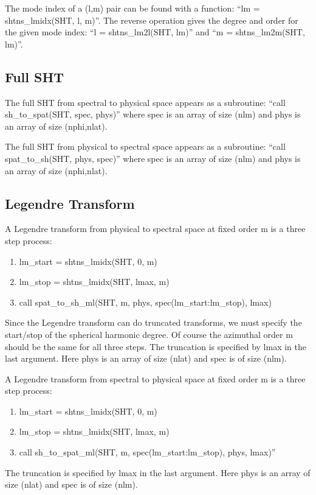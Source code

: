 \documentclass[10pt,letterpaper]{article}
\begin{document}
The mode index of a (l,m) pair can be found with a function:
``lm = shtns\_lmidx(SHT, l, m)''. The reverse operation gives the degree and order for
the given mode index: ``l = shtns\_lm2l(SHT, lm)'' and ``m = shtns\_lm2m(SHT, lm)''.

\subsection{Full SHT}
The full SHT from spectral to physical space appears as a subroutine:
``call sh\_to\_spat(SHT, spec, phys)'' where spec is an array of size (nlm) and
phys is an array of size (nphi,nlat).

The full SHT from physical to spectral space appears as a subroutine:
``call spat\_to\_sh(SHT, phys, spec)'' where spec is an array of size (nlm) and
phys is an array of size (nphi,nlat).

\subsection{Legendre Transform}
A Legendre transform from physical to spectral space at fixed order m is a three
step process:
\begin{enumerate}
  \item lm\_start = shtns\_lmidx(SHT, 0, m)
  \item lm\_stop = shtns\_lmidx(SHT, lmax, m)
  \item call spat\_to\_sh\_ml(SHT, m, phys, spec(lm\_start:lm\_stop), lmax)
\end{enumerate}
Since the Legendre transform can do truncated transforms, we must specify the start/stop
of the spherical harmonic degree. Of course the azimuthal order m should be the same
for all three steps. The truncation is specified by lmax in the last argument. Here
phys is an array of size (nlat) and spec is of size (nlm).

A Legendre transform from spectral to physical space at fixed order m is a three
step process:
\begin{enumerate}
  \item lm\_start = shtns\_lmidx(SHT, 0, m)
  \item lm\_stop = shtns\_lmidx(SHT, lmax, m)
  \item call sh\_to\_spat\_ml(SHT, m, spec(lm\_start:lm\_stop), phys, lmax)''
\end{enumerate}
The truncation is specified by lmax in the last argument. Here
phys is an array of size (nlat) and spec is of size (nlm).
\end{document}
